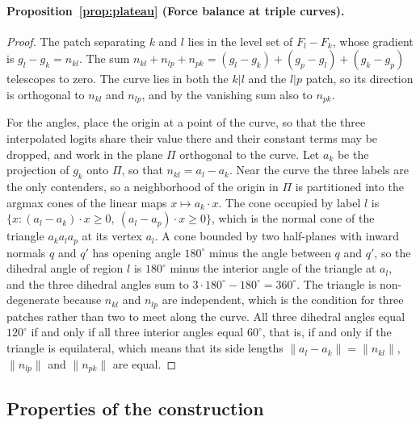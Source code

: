 \documentclass[11pt]{article}
\theoremstyle{definition}
\newcommand{\interp}{F}
\begin{document}
\paragraph*{Proposition~\ref{prop:plateau} (Force balance at triple curves).}
\begin{proof}
The patch separating $k$ and $l$ lies in the level set of
$\interp_l - \interp_k$, whose gradient is $g_l - g_k = n_{kl}$. The sum
$n_{kl} + n_{lp} + n_{pk} = (g_l - g_k) + (g_p - g_l) + (g_k - g_p)$
telescopes to zero. The curve lies in both the $k|l$ and the $l|p$ patch, so
its direction is orthogonal to $n_{kl}$ and $n_{lp}$, and by the vanishing sum
also to $n_{pk}$.

For the angles, place the origin at a point of the curve, so that the three
interpolated logits share their value there and their constant terms may be
dropped, and work in the plane $\Pi$ orthogonal to the curve. Let $a_k$ be the projection of
$g_k$ onto $\Pi$, so that $n_{kl} = a_l - a_k$. Near the curve the three
labels are the only contenders, so a neighborhood of the origin in $\Pi$ is
partitioned into the argmax cones of the linear maps $x \mapsto a_k\!\cdot\!x$.
The cone occupied by label $l$ is
$\{x : (a_l - a_k)\!\cdot\!x \ge 0,\ (a_l - a_p)\!\cdot\!x \ge 0\}$, which is
the normal cone of the triangle $a_k a_l a_p$ at its vertex $a_l$. A cone
bounded by two half-planes with inward normals $q$ and $q'$ has opening angle
$180^\circ$ minus the angle between $q$ and $q'$, so the dihedral angle of
region $l$ is $180^\circ$ minus the interior angle of the triangle at $a_l$,
and the three dihedral angles sum to $3\cdot180^\circ - 180^\circ = 360^\circ$.
The triangle is non-degenerate because $n_{kl}$ and $n_{lp}$ are
independent, which is the condition for three patches rather than two to meet
along the curve. All three dihedral angles equal $120^\circ$ if and only if
all three interior angles equal $60^\circ$, that is, if and only if the
triangle is equilateral, which means that its side lengths
$\|a_l - a_k\| = \|n_{kl}\|$, $\|n_{lp}\|$ and $\|n_{pk}\|$ are equal.
\end{proof}

\subsection{Properties of the construction}
\label{sec:proofs-construction}
\end{document}
